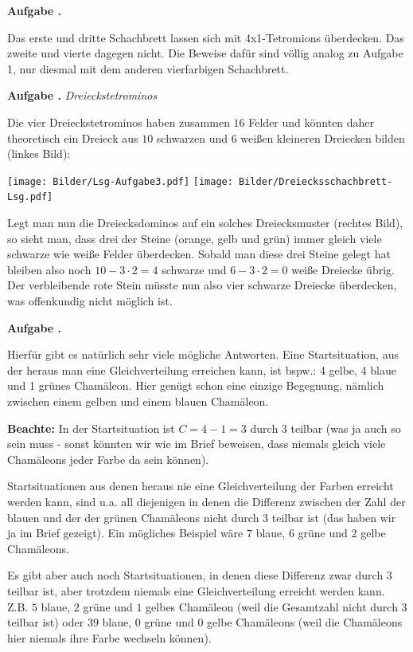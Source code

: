 \documentclass[a4paper,ngerman,12pt]{scrartcl}
\theoremstyle{definition}
\theoremstyle{plain}
\theoremstyle{remark}
\newlength{\aufgabenskip}
\newcounter{aufgabennummer}
\newenvironment{aufgabe}[1]{
	\addtocounter{aufgabennummer}{1}
	\textbf{Aufgabe \theaufgabennummer.} \emph{#1} \par
}{\vspace{\aufgabenskip}}
\begin{document}
\newpage
\begin{aufgabe}{}
	Das erste und dritte Schachbrett lassen sich mit 4x1-Tetromions überdecken. Das zweite und vierte dagegen nicht. Die Beweise dafür sind völlig analog zu Aufgabe 1, nur diesmal mit dem anderen vierfarbigen Schachbrett.
\end{aufgabe}

\begin{aufgabe}{Dreieckstetrominos}
	Die vier Dreieckstetrominos haben zusammen $16$ Felder und könnten daher theoretisch ein Dreieck aus $10$ schwarzen und $6$ weißen kleineren Dreiecken bilden (linkes Bild):
	\begin{center}
		\texttt{[image: Bilder/Lsg-Aufgabe3.pdf]} \qquad\qquad
		\texttt{[image: Bilder/Dreiecksschachbrett-Lsg.pdf]}
	\end{center}	 
	Legt man nun die Dreiecksdominos auf ein solches Dreiecksmuster (rechtes Bild), so sieht man, dass drei der Steine (orange, gelb und grün) immer gleich viele schwarze wie weiße Felder überdecken. Sobald man diese drei Steine gelegt hat bleiben also noch $10-3\cdot2=4$ schwarze und $6-3\cdot2 = 0$ weiße Dreiecke übrig. Der verbleibende rote Stein müsste nun also vier schwarze Dreiecke überdecken, was offenkundig nicht möglich ist.
\end{aufgabe}

\begin{aufgabe}{}
	Hierfür gibt es natürlich sehr viele mögliche Antworten. Eine Startsituation, aus der heraus man eine Gleichverteilung erreichen kann, ist bspw.: 4 gelbe, 4 blaue und 1 grünes Chamäleon. Hier genügt schon eine einzige Begegnung, nämlich zwischen einem gelben und einem blauen Chamäleon.
	
	\textbf{Beachte:} In der Startsituation ist $C = 4 - 1 = 3$ durch 3 teilbar (was ja auch so sein muss - sonst könnten wir wie im Brief beweisen, dass niemals gleich viele Chamäleons jeder Farbe da sein können).
	
	Startsituationen aus denen heraus nie eine Gleichverteilung der Farben erreicht werden kann, sind u.a. all diejenigen in denen die Differenz zwischen der Zahl der blauen und der der grünen Chamäleons nicht durch $3$ teilbar ist (das haben wir ja im Brief gezeigt). Ein mögliches Beispiel wäre $7$ blaue, $6$ grüne und $2$ gelbe Chamäleons.
	
	Es gibt aber auch noch Startsituationen, in denen diese Differenz zwar durch $3$ teilbar ist, aber trotzdem niemals eine Gleichverteilung erreicht werden kann. Z.B. $5$ blaue, $2$ grüne und $1$ gelbes Chamäleon (weil die Gesamtzahl nicht durch $3$ teilbar ist) oder $39$ blaue, $0$ grüne und $0$ gelbe Chamäleons (weil die Chamäleons hier niemals ihre Farbe wechseln können).
\end{aufgabe}
\end{document}
